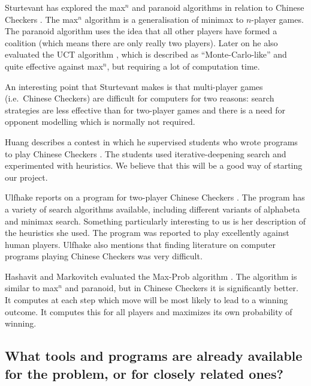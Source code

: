 \documentclass[a4paper,11pt]{article}
\begin{document}
Sturtevant has explored the max$^n$ and paranoid algorithms in
relation to Chinese Checkers
\cite{springerlink:10.1007/978-3-540-40031-8_8}. The max$^n$ algorithm
is a generalisation of minimax to $n$-player games. The paranoid
algorithm uses the idea that all other players have formed a coalition
(which means there are only really two players). Later on he also
evaluated the UCT algorithm
\cite{springerlink:10.1007/978-3-540-87608-3_4}, which is described as
``Monte-Carlo-like'' and quite effective against max$^n$, but
requiring a lot of computation time.

An interesting point that Sturtevant makes is that multi-player games
(i.e.~Chinese Checkers) are difficult for computers for two reasons:
search strategies are less effective than for two-player games and
there is a need for opponent modelling which is normally not required.

Huang describes a contest in which he supervised students who wrote
programs to play Chinese Checkers \cite{Huang:2001:SGP:378593.378708}.
The students used iter\-ative-deep\-ening search and experimented with
heuristics. We believe that this will be a good way of starting our
project.

Ulfhake reports on a program for two-player Chinese Checkers
\cite{ulfhake}. The program has a variety of search algorithms
available, including different variants of alphabeta and minimax
search. Something particularly interesting to us is her description of
the heuristics she used. The program was reported to play excellently
against human players. Ulfhake also mentions that finding literature
on computer programs playing Chinese Checkers was very difficult.

Hashavit and Markovitch evaluated the Max-Prob algorithm
\cite{Hashavit}. The algorithm is similar to max$^n$ and paranoid, but
in Chinese Checkers it is significantly better. It computes at each
step which move will be most likely to lead to a winning outcome. It
computes this for all players and maximizes its own probability of
winning.


\subsection{What tools and programs are already available for the problem, or for closely related ones?}
\end{document}
